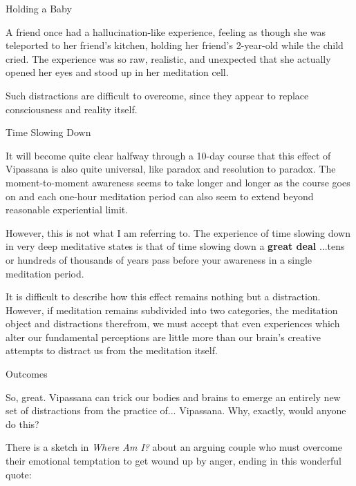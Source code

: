\documentclass{article}
\begin{document}
\vspace{1cm}
\begin{center}
  \LARGE{Holding a Baby}
\end{center}

A friend once had a hallucination-like experience, feeling as though she was teleported to her friend's kitchen, holding her friend's 2-year-old while the child cried. The experience was so raw, realistic, and unexpected that she actually opened her eyes and stood up in her meditation cell.

Such distractions are difficult to overcome, since they appear to replace consciousness and reality itself.

\vspace{1cm}
\begin{center}
  \LARGE{Time Slowing Down}
\end{center}

It will become quite clear halfway through a 10-day course that this effect of Vipassana is also quite universal, like paradox and resolution to paradox. The moment-to-moment awareness seems to take longer and longer as the course goes on and each one-hour meditation period can also seem to extend beyond reasonable experiential limit.

However, this is not what I am referring to. The experience of time slowing down in very deep meditative states is that of time slowing down a \textbf{great deal} ...tens or hundreds of thousands of years pass before your awareness in a single meditation period.

It is difficult to describe how this effect remains nothing but a distraction. However, if meditation remains subdivided into two categories, the meditation object and distractions therefrom, we must accept that even experiences which alter our fundamental perceptions are little more than our brain's creative attempts to distract us from the meditation itself.


\pagebreak

\begin{center}
  \Huge{Outcomes}
\end{center}

So, great. Vipassana can trick our bodies and brains to emerge an entirely new set of distractions from the practice of... Vipassana. Why, exactly, would anyone do this?

There is a sketch in \textit{Where Am I?} \cite{whereami} about an arguing couple who must overcome their emotional temptation to get wound up by anger, ending in this wonderful quote:
\end{document}
